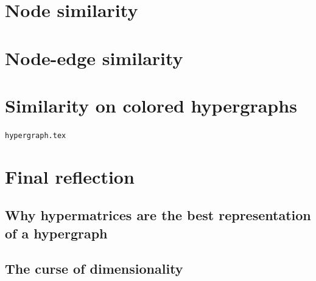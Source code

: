 \documentclass[a4paper,11pt]{report}
\begin{document}
\section{Node similarity}
\section{Node-edge similarity}
\section{Similarity on colored hypergraphs}
\texttt{hypergraph.tex}

\section{Final reflection}
\subsection{Why hypermatrices are the best representation of a hypergraph}\label{promohypermatrices}
\subsection{The curse of dimensionality}
\end{document}
